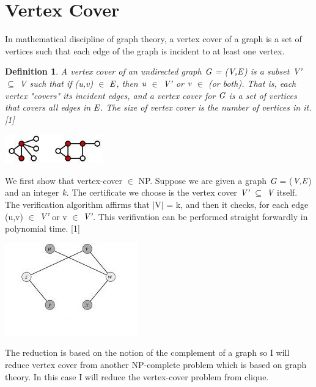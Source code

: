 \documentclass[a4paper]{report}
\newtheorem{defi}{Definition}
\begin{document}
\section{Vertex Cover }

In mathematical discipline of graph theory, a vertex cover of a graph is a set of vertices such that each edge of the graph is incident to at least one vertex.

\begin{defi}
A vertex cover of an undirected graph $\emph{G}$ = ($\emph{V,E}$) is a subset $\emph{V'}$ $\subseteq$ $\emph{V}$ such that if (u,v) $\in$ $\emph{E}$, then $\emph{u}$ $\in$ $\emph{V'}$ or $\emph{v}$ $\in$ (or both). That is, each vertex "covers" its incident edges, and a vertex cover for $\emph{G}$ is a set of vertices that covers all edges in $\emph{E}$. The size of vertex cover is the number of vertices in it. [1]
\end{defi}

\begin{center}
\includegraphics[scale=1.11]{vertex1.png}
\end{center}

We first show that vertex-cover $\in$ NP. Suppose we are given a graph $\emph{G}$ = ($\emph{V,E}$) and an integer $\emph{k}$. The certificate we choose is the vertex cover $\emph{V'}$ $\subseteq$ $\emph{V}$ itself. The verification algorithm affirms that $\vert$V$\vert$ = k, and then it checks, for each edge (u,v) $\in$ $\emph{V'}$ or v $\in$ $\emph{V'}$. This verifivation can be performed straight forwardly in polynomial time. [1]

\begin{center}
\includegraphics[scale=0.90]{vertex.png}
\end{center}

The reduction is based on the notion of the complement of a graph so I will reduce vertex cover from another NP-complete problem which is based on graph theory. In this case I will reduce the vertex-cover problem from clique.
\end{document}
